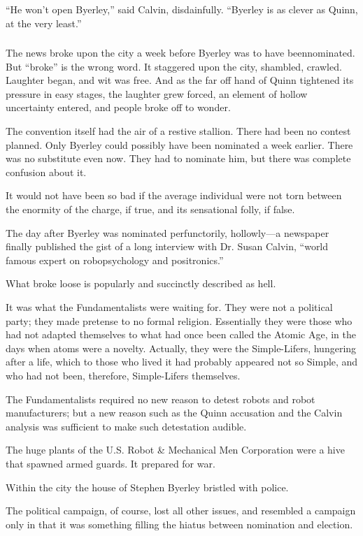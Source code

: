 \documentclass[10pt,a5paper,twoside]{book}
\begin{document}
“He won’t open Byerley,” said Calvin, disdainfully. “Byerley is as clever as Quinn, at the very least.”

\subsubsection*{}
The news broke upon the city a week before Byerley was to have beennominated. But “broke” is the wrong word. It staggered upon the city, shambled, crawled. Laughter began, and wit was free. And as the far off hand of Quinn tightened its pressure in easy stages, the laughter grew forced, an element of hollow uncertainty entered, and people broke off to wonder.

The convention itself had the air of a restive stallion. There had been no contest planned. Only Byerley could possibly have been nominated a week earlier. There was no substitute even now. They had to nominate him, but there was complete confusion about it.

It would not have been so bad if the average individual were not torn between the enormity of the charge, if true, and its sensational folly, if false.

The day after Byerley was nominated perfunctorily, hollowly—a newspaper finally published the gist of a long interview with Dr. Susan Calvin, “world famous expert on robopsychology and positronics.”

What broke loose is popularly and succinctly described as hell.

It was what the Fundamentalists were waiting for. They were not a political party; they made pretense to no formal religion. Essentially they were those who had not adapted themselves to what had once been called the Atomic Age, in the days when atoms were a novelty. Actually, they were the Simple-Lifers, hungering after a life, which to those who lived it had probably appeared not so Simple, and who had not been, therefore, Simple-Lifers themselves.

The Fundamentalists required no new reason to detest robots and robot manufacturers; but a new reason such as the Quinn accusation and the Calvin analysis was sufficient to make such detestation audible.

The huge plants of the U.S. Robot \& Mechanical Men Corporation were a hive that spawned armed guards. It prepared for war.

Within the city the house of Stephen Byerley bristled with police.

The political campaign, of course, lost all other issues, and resembled a campaign only in that it was something filling the hiatus between nomination and election.
\end{document}
